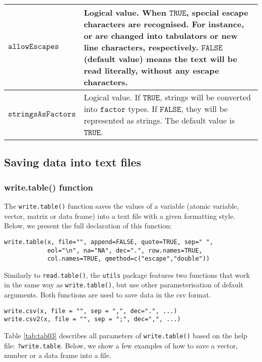 \documentclass[]{book}
\theoremstyle{definition}
\theoremstyle{definition}
\theoremstyle{definition}
\theoremstyle{remark}
\begin{document}
\begin{table}
\begin{tabular}[t]{>{}l||>{\raggedright\arraybackslash}p{35em}}
\hline
$\texttt{allowEscapes}$ & Logical value. When $\texttt{TRUE}$, special escape characters are recognised. For instance,   or 
 are changed into tabulators or new line characters, respectively. $\texttt{FALSE}$ (default value) means the text will be read literally, without any escape characters.\\
\hline
$\texttt{stringsAsFactors}$ & Logical value. If $\texttt{TRUE}$, strings will be converted into $\texttt{factor}$ types. If $\texttt{FALSE}$, they will be represented as strings. The default value is $\texttt{TRUE}$.\\
\hline
\end{tabular}
\end{table}

\subsection{Saving data into text files}\label{part_263}

\subsubsection{write.table() function}\label{part_2631}

The \texttt{write.table()} function saves the values of a variable
(atomic variable, vector, matrix or data frame) into a text file with a
given formatting style. Below, we present the full declaration of this
function:

\begin{verbatim}
write.table(x, file="", append=FALSE, quote=TRUE, sep=" ",
            eol="\n", na="NA", dec=".", row.names=TRUE,
            col.names=TRUE, qmethod=c("escape","double"))
\end{verbatim}

Similarly to \texttt{read.table()}, the \texttt{utils} package features
two functions that work in the same way as \texttt{write.table()}, but
use other parameterisation of default arguments. Both functions are used
to save data in the csv format.

\begin{verbatim}
write.csv(x, file = "", sep = ",", dec=".", ...)
write.csv2(x, file = "", sep = ";", dec=",", ...)
\end{verbatim}

Table \ref{tab:tab03} describes all parameters of \texttt{write.table()}
based on the help file: \texttt{?write.table}. Below, we show a few
examples of how to save a vector, number or a data frame into a file.
\end{document}
